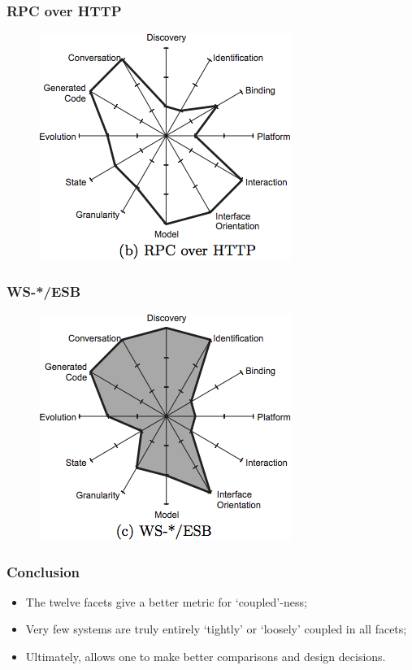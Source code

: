 \documentclass{beamer}
\begin{document}
\begin{frame}
    \frametitle{RPC over HTTP}
    \begin{figure}
        \centering
        \includegraphics[height=0.6\paperheight]{fig3-2.png}
    \end{figure}
\end{frame}

\begin{frame}
    \frametitle{WS-*/ESB}
    \begin{figure}
        \centering
        \includegraphics[height=0.6\paperheight]{fig3-3.png}
    \end{figure}
\end{frame}

\begin{frame}
    \frametitle{Conclusion}
    \begin{itemize}
        \item The twelve facets give a better metric for `coupled'-ness;
        \item Very few systems are truly entirely `tightly' or `loosely' coupled in all facets;
        \item Ultimately, allows one to make better comparisons and design decisions.
    \end{itemize}
\end{frame}
\end{document}

